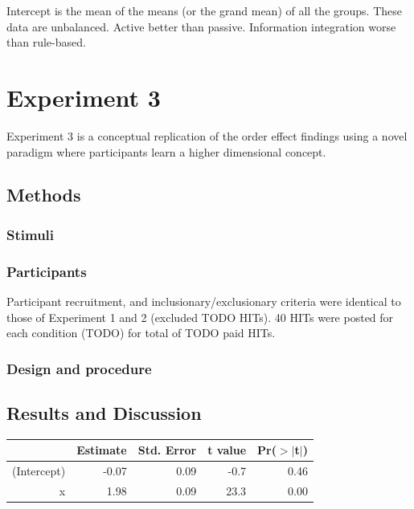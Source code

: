\documentclass[10pt, letterpaper]{article}
\begin{document}
Intercept is the mean of the means (or the grand mean) of all the
groups. These data are unbalanced. Active better than passive.
Information integration worse than rule-based.

\section{Experiment 3}\label{experiment-3}

Experiment 3 is a conceptual replication of the order effect findings
using a novel paradigm where participants learn a higher dimensional
concept.

\subsection{Methods}\label{methods-3}

\subsubsection{Stimuli}\label{stimuli-3}

\subsubsection{Participants}\label{participants-3}

Participant recruitment, and inclusionary/exclusionary criteria were
identical to those of Experiment 1 and 2 (excluded TODO HITs). 40 HITs
were posted for each condition (TODO) for total of TODO paid HITs.

\subsubsection{Design and procedure}\label{design-and-procedure-3}

\subsection{Results and Discussion}\label{results-and-discussion-3}

\begin{table}[H]
\centering
\begin{tabular}{rrrrr}
  \hline
 & Estimate & Std. Error & t value & Pr($>$$|$t$|$) \\ 
  \hline
(Intercept) & -0.07 & 0.09 & -0.7 & 0.46 \\ 
  x & 1.98 & 0.09 & 23.3 & 0.00 \\ 
   \hline
\end{tabular}
\end{table}
\end{document}
